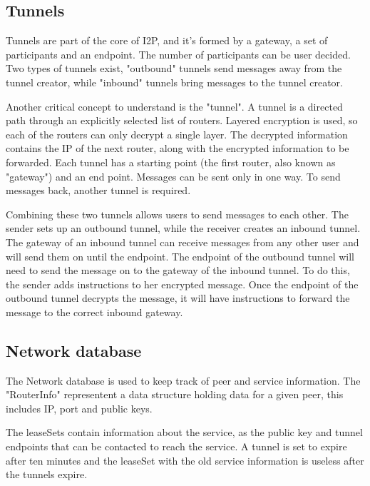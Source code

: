 \documentclass[a4paper,twocolumn,12pt]{article}
\begin{document}
\subsection{Tunnels}

Tunnels are part of the core of I2P, and it's formed by a gateway, a set of participants and an endpoint. The number of participants can be user decided. Two types of tunnels exist, "outbound" tunnels send messages away from the tunnel creator, while "inbound" tunnels bring messages to the tunnel creator.

Another critical concept to understand is the "tunnel". A tunnel is a directed path through an explicitly selected list of routers. Layered encryption is used, so each of the routers can only decrypt a single layer. The decrypted information contains the IP of the next router, along with the encrypted information to be forwarded. Each tunnel has a starting point (the first router, also known as "gateway") and an end point. Messages can be sent only in one way. To send messages back, another tunnel is required.

Combining these two tunnels allows users to send messages to each other. The sender sets up an outbound tunnel, while the receiver creates an inbound tunnel. The gateway of an inbound tunnel can receive messages from any other user and will send them on until the endpoint. The endpoint of the outbound tunnel will need to send the message on to the gateway of the inbound tunnel. To do this, the sender adds instructions to her encrypted message. Once the endpoint of the outbound tunnel decrypts the message, it will have instructions to forward the message to the correct inbound gateway.

\subsection{Network database}

The Network database is used to keep track of peer and service information. The "RouterInfo" representent a data structure holding data for a given peer, this includes IP, port and public keys.

The leaseSets contain information about the service, as the public key and tunnel endpoints that can be contacted to reach the service. A tunnel is set to expire after ten minutes and the leaseSet with the old service information is useless after the tunnels expire. 




\end{document}
